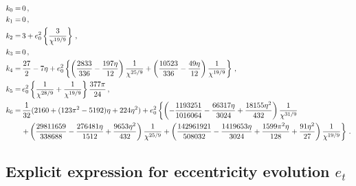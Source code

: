 \documentclass[aps,prd,twocolumn,superscriptaddress,groupedaddress,nofootinbib,showpacs,eqsecnum,useAms]{revtex4-2}
\begin{document}
\begin{widetext}
\begin{subequations}
\label{eq:k_coeff}
\begin{align}
k_{0} =& \, 0\,, \\
k_{1} =& \, 0\,, \\
k_{2} =& \, 3 + e_0^2 \left\{ \frac{3}{\chi^{19/9}} \right\}\,, \\
k_{3} =& \, 0 \,,\\
k_{4} =& \, \frac{27}{2} - 7\eta + e_0^2 \left\{ \left(\frac{2833}{336} - \frac{197\eta}{12}\right)\frac{1}{\chi^{25/9}} + \left(\frac{10523}{336} - \frac{49\eta}{12}\right)\frac{1}{\chi^{19/9}} \right\}\,, \\
k_{5} =& \, e_0^2 \left\{ \frac{1}{\chi^{28/9}} + \frac{1}{\chi^{19/9}} \right\}\frac{377\pi}{24}\,, \\
k_{6} =& \, \frac{1}{32}(2160 +( 123\pi^2 - 5192)\eta + 224\eta^2) + e_0^2 \left\{ \left(-\frac{1193251}{1016064} -\frac{66317\eta}{3024} +\frac{18155\eta^2}{432}\right)\frac{1}{\chi^{31/9}} \right. \notag \\ 
& \left. + \left(\frac{29811659}{338688} -\frac{276481\eta}{1512} +\frac{9653\eta^2}{432}\right)\frac{1}{\chi^{25/9}} + \left(\frac{142961921}{508032} -\frac{1419653\eta }{3024} +\frac{1599 \pi^2\eta}{128} +\frac{91\eta^2}{27} \right)\frac{1}{\chi^{19/9}} \right\}\,.
\end{align}
\end{subequations}
\end{widetext}

\subsection{ Explicit expression for eccentricity evolution $e_t$}\label{sec: et evolution}
\end{document}
